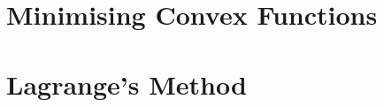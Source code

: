 \documentclass[british,11pt,a4paper]{report}
\begin{document}
\maketitle
\tableofcontents
\chapter{Minimising Convex Functions}

\chapter{Lagrange's Method}

\end{document}
